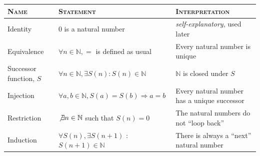 \documentclass[letterpaper,twoside]{article}
\begin{document}
\begin{table}[H]
    \centering
    \begin{doublespace}
        \setlength\tabcolsep{0pt}
        \begin{tabular*}{0.95\linewidth}{@{\extracolsep{\fill}} lll}
            \textsc{Name} & \textsc{Statement} & \textsc{Interpretation}\\
            \hline
            Identity                & $0$ is a natural number & \textit{self-explanatory}, used later\\
            Equivalence & $\forall n\in \mathbb{N}, = $ is defined as usual & Every natural number is unique \\
            Successor function, $S$ \hspace{2mm} & $\forall n \in \mathbb{N}, \exists S(n) : S(n) \in \mathbb{N}$ & $\mathbb{N}$ is closed under $S$ \\
            Injection               & $\forall a,b \in \mathbb{N}, S(a) = S(b) \Longrightarrow a = b$ & Every natural number has a unique successor\\
            Restriction             & $\not\exists n \in \mathbb{N}$ such that $S(n) = 0$ & The natural numbers do not ``loop back''\\
            Induction               & $\forall S(n), \exists S(n+1)$ : $S(n+1) \in \mathbb{N}$ & There is always a ``next'' natural number\\
        \end{tabular*}
    \end{doublespace}
    \normalsize
\end{table}
\end{document}
